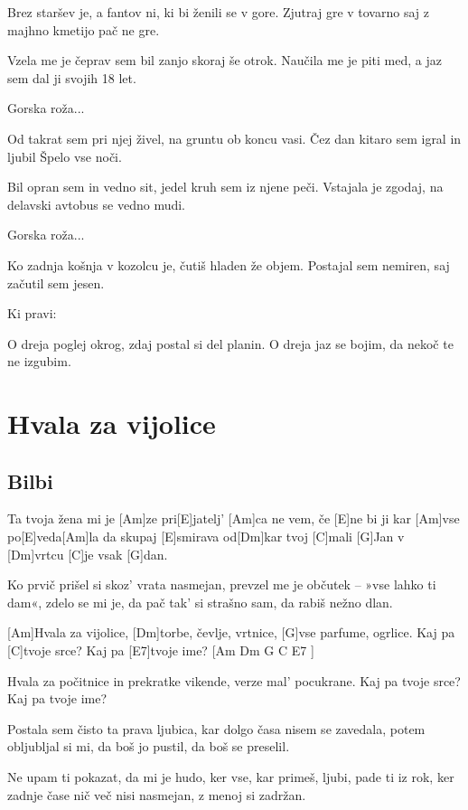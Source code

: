 \documentclass[a4paper,12pt]{article}
\begin{document}
\begin{multicols}{2}
\begin{guitar}
Brez staršev je, a fantov ni,
ki bi ženili se v gore.
Zjutraj gre v tovarno
saj z majhno kmetijo pač ne gre.


Vzela me je čeprav sem bil
zanjo skoraj še otrok.
Naučila me je piti med,
a jaz sem dal ji svojih 18 let.


Gorska roža...


Od takrat sem pri njej živel,          
na gruntu ob koncu vasi.
Čez dan kitaro sem igral 
in ljubil Špelo vse noči.


Bil opran sem in vedno sit,
jedel kruh sem iz njene peči.
Vstajala je zgodaj, na delavski
avtobus se vedno mudi.


Gorska roža...


Ko zadnja košnja v kozolcu je,
čutiš hladen že objem.
Postajal sem nemiren, 
saj začutil sem jesen. 


Ki pravi:


O dreja poglej okrog,
zdaj postal si del planin.
O dreja jaz se bojim, 
da nekoč te ne izgubim.

\end{guitar}
\section{Hvala za vijolice}
\subsection*{Bilbi}
\begin{guitar}
[E]Ta tvoja žena mi je [Am]ze pri[E]jatelj' [Am]ca 
ne vem, če [E]ne bi ji kar [Am]vse po[E]veda[Am]la 
da skupaj [E]smirava od[Dm]kar tvoj [C]mali [G]Jan 
v [Dm]vrtcu [C]je vsak [G]dan. 


Ko prvič prišel si skoz’ vrata nasmejan, 
prevzel me je občutek – »vse lahko ti dam«, 
zdelo se mi je, da pač tak’ si strašno sam, 
da rabiš nežno dlan. 


[Am]Hvala  za  vijolice,
[Dm]torbe, čevlje, vrtnice,
[G]vse parfume, ogrlice.
Kaj pa [C]tvoje srce?
Kaj pa [E7]tvoje ime?  [Am Dm G C E7 ]


Hvala za počitnice 
in prekratke vikende, 
verze mal’ pocukrane. 
Kaj pa tvoje srce? 
Kaj pa tvoje ime? 


Postala sem čisto ta prava ljubica, 
kar dolgo časa nisem se zavedala, 
potem obljubljal si mi, da boš jo pustil, 
da boš se preselil. 


Ne upam ti pokazat, da mi je hudo, 
ker vse, kar primeš, ljubi, pade ti iz rok, 
ker zadnje čase nič več nisi nasmejan, 
z menoj si zadržan. 



\end{guitar}
\end{multicols}
\end{document}
